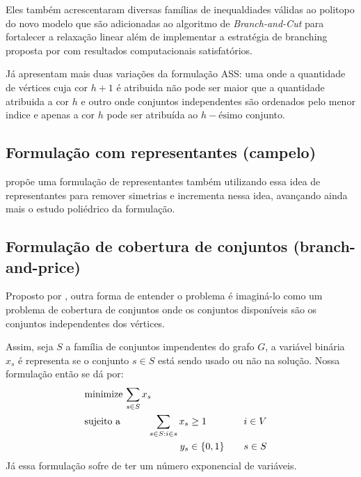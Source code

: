 \documentclass[11pt]{article}
\begin{document}
Eles também acrescentaram diversas famílias de inequaldiades válidas ao politopo do novo modelo que são adicionadas ao algoritmo de \emph{Branch-and-Cut}  para fortalecer a relaxação linear além de implementar a estratégia de branching proposta por \textcite{Brelaz1979Newmethodscolor} com resultados computacionais satisfatórios.

Já \textcite{MendezDiaz2008CuttingPlaneAlgorithm} apresentam mais duas variações da formulação ASS: uma onde a quantidade de vértices cuja cor \(h+1\) é atribuida não pode ser maior que a quantidade atribuida a cor \(h\) e outro onde conjuntos independentes são ordenados pelo menor indice e apenas a cor \(h\) pode ser atribuída ao \(h-\text{ésimo}\) conjunto.

\subsection{Formulação com representantes (campelo)}
\label{sec:org6466c4f}
\textcite{Campelo2004CliquesHolesVertex} propõe uma formulação de representantes também utilizando essa idea de representantes para remover simetrias e \textcite{Campelo2008AsymmetricRepresentativesFormulation} incrementa nessa idea, avançando ainda mais o estudo poliédrico da formulação.
\subsection{Formulação de cobertura de conjuntos (branch-and-price)}
\label{sec:orgba418f1}
Proposto por \textcite{Mehrotra1996ColumnGenerationApproach}, outra forma de entender o problema é imaginá-lo como um problema de cobertura de conjuntos onde os conjuntos disponíveis são os conjuntos independentes dos vértices.

Assim, seja \(S\) a família de conjuntos impendentes do grafo \(G\), a variável binária \(x_s\) é representa se o conjunto \(s \in S\) está sendo usado ou não na solução. Nossa formulação então se dá por:
\begin{alignat*}{4}
& \omit\rlap{minimize  $\displaystyle \sum_{s \in S} x_s$} \\
& \mbox{sujeito a}&& \quad & \sum_{s \in S: i \in s} x_{s}&\geq 1 & \quad & i \in V \label{rest9} \\
&                 &&   & y_s       & \in \{0,1\} &    & s \in S
\end{alignat*}
Já essa formulação sofre de ter um número exponencial de variáveis.
\end{document}
